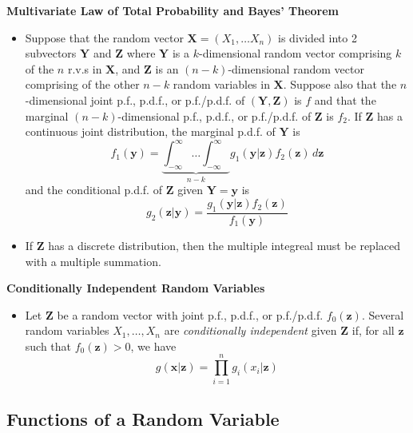\documentclass[11pt]{article}
\begin{document}
\begin{itemize}
    \textbf{Multivariate Law of Total Probability and Bayes' Theorem}
    \begin{itemize}
        \item Suppose that the random vector $\boldsymbol{X}=(X_1, \ldots X_n)
        $ is divided into 2 subvectors $\boldsymbol{Y}$ and $\boldsymbol{Z}$ where 
        $\boldsymbol{Y}$ is a $k$-dimensional random vector comprising $k$ of the $n$ r.v.s in 
        $\boldsymbol{X}$, and $\boldsymbol{Z}$ is an $(n-k)$-dimensional random vector 
        comprising of the other $n-k$ random variables in $\boldsymbol{X}$. Suppose also that 
        the $n$-dimensional joint p.f., p.d.f., or p.f./p.d.f. of $(\boldsymbol{Y}, 
        \boldsymbol{Z})$ is $f$ and that the marginal $(n-k)$-dimensional p.f., p.d.f., or
        p.f./p.d.f. of $\boldsymbol{Z}$ is $f_2$. If $\boldsymbol{Z}$ has a continuous joint
        distribution, the marginal p.d.f. of $\boldsymbol{Y}$ is 
        \[f_1(\boldsymbol{y})= \underbrace{\int_{-\infty}^{\infty} \ldots \int_{-\infty}^{
        \infty} }_{n-k} g_1(\boldsymbol{y}|\boldsymbol{z})f_2(\boldsymbol{z})\,d
        \boldsymbol{z}\]
        and the conditional p.d.f. of $\boldsymbol{Z}$ given $\boldsymbol{Y}=\boldsymbol{y}$ 
        is
        \[g_2(\boldsymbol{z}|\boldsymbol{y})=\frac{g_1(\boldsymbol{y}|\boldsymbol{z})f_2(
        \boldsymbol{z})}{f_1(\boldsymbol{y})}\]
        \item If $\boldsymbol{Z}$ has a discrete distribution, then the multiple integreal 
        must be replaced with a multiple summation. 
    \end{itemize}

    \textbf{Conditionally Independent Random Variables}
    \begin{itemize}
        \item Let $\boldsymbol{Z}$ be a random vector with joint p.f., p.d.f., or p.f./p.d.f.
        $f_0(\boldsymbol{z})$. Several random variables $X_1, \ldots, X_n$ are \textit{
        conditionally independent} given $\boldsymbol{Z}$ if, for all $\boldsymbol{z}$ such 
        that $f_0(\boldsymbol{z})>0$, we have 
        \[g(\boldsymbol{x}|\boldsymbol{z})= \prod_{i=1}^{n}g_i(x_i|\boldsymbol{z})\]
    \end{itemize}
\end{itemize}

\subsection{Functions of a Random Variable}
\end{document}
